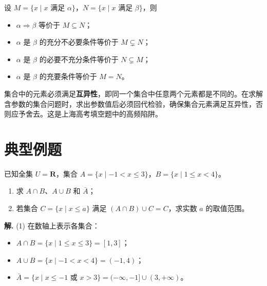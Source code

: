 \documentclass[11pt]{ctexrep}
\begin{document}
\begin{property}[推出关系与集合包含的对应]
    设 $M = \{ x \mid x \text{ 满足 } \alpha \}$，$N = \{ x \mid x \text{ 满足 } \beta \}$，则
    \begin{itemize}
        \item $\alpha \Rightarrow \beta$ 等价于 $M \subseteq N$；
        \item $\alpha$ 是 $\beta$ 的充分不必要条件等价于 $M \subsetneq N$；
        \item $\alpha$ 是 $\beta$ 的必要不充分条件等价于 $N \subsetneq M$；
        \item $\alpha$ 是 $\beta$ 的充要条件等价于 $M = N$。
    \end{itemize}
\end{property}

\begin{property}[集合元素的互异性]
    集合中的元素必须满足\textbf{互异性}，即同一个集合中任意两个元素都是不同的。在求解含参数的集合问题时，求出参数值后必须回代检验，确保集合元素满足互异性，否则应予舍去。这是上海高考填空题中的高频陷阱。
\end{property}

\section*{典型例题}

\begin{example}
    已知全集 $U = \mathbf{R}$，集合 $A = \{ x \mid -1 < x \leq 3 \}$，$B = \{ x \mid 1 \leq x < 4 \}$。
    \begin{enumerate}
        \item 求 $A \cap B$、$A \cup B$ 和 $\bar{A}$；
        \item 若集合 $C = \{ x \mid x \leq a \}$ 满足 $(A \cap B) \cup C = C$，求实数 $a$ 的取值范围。
    \end{enumerate}
\end{example}

\textbf{解.} (1) 在数轴上表示各集合：
\begin{itemize}
    \item $A \cap B = \{ x \mid 1 \leq x \leq 3 \} = [1, 3]$；
    \item $A \cup B = \{ x \mid -1 < x < 4 \} = (-1, 4)$；
    \item $\bar{A} = \{ x \mid x \leq -1 \text{ 或 } x > 3 \} = (-\infty, -1] \cup (3, +\infty)$。
\end{itemize}
\end{document}
